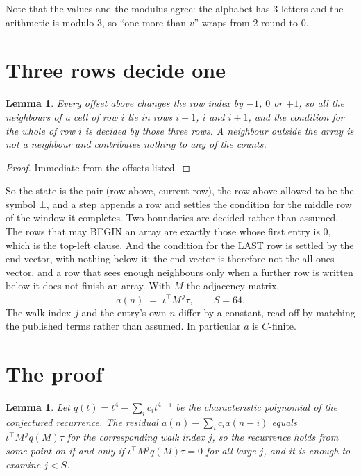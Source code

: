 \documentclass[11pt,a4paper]{article}
\theoremstyle{plain}
\newtheorem{lemma}[theorem]{Lemma}
\theoremstyle{definition}
\begin{document}
Note that the values and the modulus agree: the alphabet has $3$ letters and the arithmetic
is modulo $3$, so ``one more than $v$'' wraps from $2$ round to $0$.

\section{Three rows decide one}

\begin{lemma}\label{lem:win}
Every offset above changes the row index by $-1$, $0$ or $+1$, so all the neighbours of a cell
of row $i$ lie in rows $i-1$, $i$ and $i+1$, and the condition for the whole of row $i$ is
decided by those three rows. A neighbour outside the array is not a neighbour and contributes
nothing to any of the counts.
\end{lemma}

\begin{proof}
Immediate from the offsets listed.
\end{proof}

So the state is the pair (row above, current row), the row above allowed to be the symbol
$\bot$, and a step appends a row and settles the condition for the middle row of the window it
completes. Two boundaries are decided rather than assumed. The rows that may BEGIN an array are
exactly those whose first entry is $0$, which is the top-left clause. And the condition for the
LAST row is settled by the end vector, with nothing below it: the end vector is therefore not
the all-ones vector, and a row that sees enough neighbours only when a further row is written
below it does not finish an array. With $M$ the adjacency matrix,
\[
a(n)\;=\;\iota^{\!\top}M^{\,j}\tau ,\qquad S=64.
\]
The walk index $j$ and the entry's own $n$ differ by a constant, read off by matching the
published terms rather than assumed. In particular $a$ is $C$-finite.

\section{The proof}

\begin{lemma}\label{lem:crit}
Let $q(t)=t^{4}-\sum_i c_it^{4-i}$ be the characteristic polynomial of the
conjectured recurrence. The residual $a(n)-\sum_ic_ia(n-i)$ equals
$\iota^{\!\top}M^{\,j}q(M)\tau$ for the corresponding walk index $j$, so the recurrence
holds from some point on if and only if $\iota^{\!\top}M^{j}q(M)\tau=0$ for all large $j$,
and it is enough to examine $j<S$.
\end{lemma}
\end{document}

